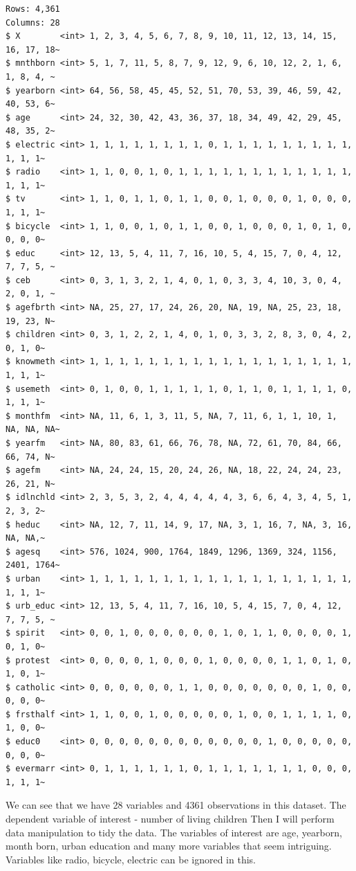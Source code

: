 \documentclass[
  letterpaper,
  DIV=11,
  numbers=noendperiod]{scrartcl}
\begin{document}
\begin{verbatim}
Rows: 4,361
Columns: 28
$ X        <int> 1, 2, 3, 4, 5, 6, 7, 8, 9, 10, 11, 12, 13, 14, 15, 16, 17, 18~
$ mnthborn <int> 5, 1, 7, 11, 5, 8, 7, 9, 12, 9, 6, 10, 12, 2, 1, 6, 1, 8, 4, ~
$ yearborn <int> 64, 56, 58, 45, 45, 52, 51, 70, 53, 39, 46, 59, 42, 40, 53, 6~
$ age      <int> 24, 32, 30, 42, 43, 36, 37, 18, 34, 49, 42, 29, 45, 48, 35, 2~
$ electric <int> 1, 1, 1, 1, 1, 1, 1, 1, 0, 1, 1, 1, 1, 1, 1, 1, 1, 1, 1, 1, 1~
$ radio    <int> 1, 1, 0, 0, 1, 0, 1, 1, 1, 1, 1, 1, 1, 1, 1, 1, 1, 1, 1, 1, 1~
$ tv       <int> 1, 1, 0, 1, 1, 0, 1, 1, 0, 0, 1, 0, 0, 0, 1, 0, 0, 0, 1, 1, 1~
$ bicycle  <int> 1, 1, 0, 0, 1, 0, 1, 1, 0, 0, 1, 0, 0, 0, 1, 0, 1, 0, 0, 0, 0~
$ educ     <int> 12, 13, 5, 4, 11, 7, 16, 10, 5, 4, 15, 7, 0, 4, 12, 7, 7, 5, ~
$ ceb      <int> 0, 3, 1, 3, 2, 1, 4, 0, 1, 0, 3, 3, 4, 10, 3, 0, 4, 2, 0, 1, ~
$ agefbrth <int> NA, 25, 27, 17, 24, 26, 20, NA, 19, NA, 25, 23, 18, 19, 23, N~
$ children <int> 0, 3, 1, 2, 2, 1, 4, 0, 1, 0, 3, 3, 2, 8, 3, 0, 4, 2, 0, 1, 0~
$ knowmeth <int> 1, 1, 1, 1, 1, 1, 1, 1, 1, 1, 1, 1, 1, 1, 1, 1, 1, 1, 1, 1, 1~
$ usemeth  <int> 0, 1, 0, 0, 1, 1, 1, 1, 1, 0, 1, 1, 0, 1, 1, 1, 1, 0, 1, 1, 1~
$ monthfm  <int> NA, 11, 6, 1, 3, 11, 5, NA, 7, 11, 6, 1, 1, 10, 1, NA, NA, NA~
$ yearfm   <int> NA, 80, 83, 61, 66, 76, 78, NA, 72, 61, 70, 84, 66, 66, 74, N~
$ agefm    <int> NA, 24, 24, 15, 20, 24, 26, NA, 18, 22, 24, 24, 23, 26, 21, N~
$ idlnchld <int> 2, 3, 5, 3, 2, 4, 4, 4, 4, 4, 3, 6, 6, 4, 3, 4, 5, 1, 2, 3, 2~
$ heduc    <int> NA, 12, 7, 11, 14, 9, 17, NA, 3, 1, 16, 7, NA, 3, 16, NA, NA,~
$ agesq    <int> 576, 1024, 900, 1764, 1849, 1296, 1369, 324, 1156, 2401, 1764~
$ urban    <int> 1, 1, 1, 1, 1, 1, 1, 1, 1, 1, 1, 1, 1, 1, 1, 1, 1, 1, 1, 1, 1~
$ urb_educ <int> 12, 13, 5, 4, 11, 7, 16, 10, 5, 4, 15, 7, 0, 4, 12, 7, 7, 5, ~
$ spirit   <int> 0, 0, 1, 0, 0, 0, 0, 0, 0, 1, 0, 1, 1, 0, 0, 0, 0, 1, 0, 1, 0~
$ protest  <int> 0, 0, 0, 0, 1, 0, 0, 0, 1, 0, 0, 0, 0, 1, 1, 0, 1, 0, 1, 0, 1~
$ catholic <int> 0, 0, 0, 0, 0, 0, 1, 1, 0, 0, 0, 0, 0, 0, 0, 1, 0, 0, 0, 0, 0~
$ frsthalf <int> 1, 1, 0, 0, 1, 0, 0, 0, 0, 0, 1, 0, 0, 1, 1, 1, 1, 0, 1, 0, 0~
$ educ0    <int> 0, 0, 0, 0, 0, 0, 0, 0, 0, 0, 0, 0, 1, 0, 0, 0, 0, 0, 0, 0, 0~
$ evermarr <int> 0, 1, 1, 1, 1, 1, 1, 0, 1, 1, 1, 1, 1, 1, 1, 0, 0, 0, 1, 1, 1~
\end{verbatim}

We can see that we have 28 variables and 4361 observations in this
dataset. The dependent variable of interest - number of living children
Then I will perform data manipulation to tidy the data. The variables of
interest are age, yearborn, month born, urban education and many more
variables that seem intriguing. Variables like radio, bicycle, electric
can be ignored in this.
\end{document}
